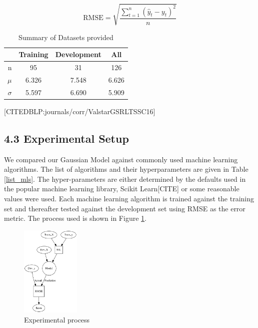 \documentclass{article}
\begin{document}
 	\begin{equation}\label{eq:rmse}
  	\text{RMSE} = \sqrt{\frac{\sum_{t=1}^n (\hat y_t - y_t)^2}{n}}
 	\end{equation}
 	\begin{table}
 		\begin{center}
  			\begin{tabular}{ | r | c | c || c | }
    			\hline
			 & Training & Development & All \\ \hline
			 n               & 95 & 31 & 126 \\ \hline
			 $\mu$           & 6.326 & 7.548 & 6.626 \\ \hline
			 $\sigma$        & 5.597 & 6.690 & 5.909 \\ \hline
			 \end{tabular}
		\end{center}
 	\caption{Summary of Datasets provided}
 	\label{summary_table}
 	\end{table}
 	[CITEDBLP:journals/corr/ValstarGSRLTSSC16]
 
	\subsection{4.3	Experimental Setup}
	We compared our Gaussian Model against commonly used machine learning algorithms. The list of algorithms and their hyperparameters are given in Table \ref{list_mls}. The hyper-parameters are either determined by the defaults used in the popular machine learning library, Scikit Learn[CITE] or some reasonable values were used. Each machine learning algorithm is trained against the training set and thereafter tested against the development set using RMSE as the error metric. The process used is shown in Figure \ref{process}.
	\begin{figure}
 		\begin{center}
		\includegraphics[width=0.25\textwidth]{process}
  		\end{center}
  		\caption{Experimental process}
  		\label{process}
 	\end{figure}

\end{document}
